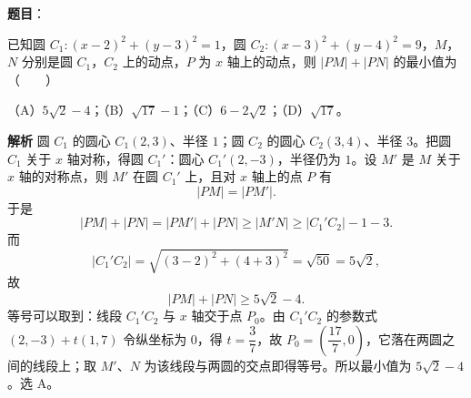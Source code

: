 \begin{answer}

\textbf{题目}：

已知圆 $C_1:(x-2)^2+(y-3)^2=1$，圆 $C_2:(x-3)^2+(y-4)^2=9$，$M$，$N$ 分别是圆 $C_1$，$C_2$ 上的动点，$P$ 为 $x$ 轴上的动点，则 $|PM|+|PN|$ 的最小值为\mbox{（　　）}

（A）$5\sqrt2-4$；（B）$\sqrt{17}-1$；（C）$6-2\sqrt2$；（D）$\sqrt{17}$。

\textbf{解析}
圆 $C_1$ 的圆心 $C_1(2,3)$、半径 $1$；圆 $C_2$ 的圆心 $C_2(3,4)$、半径 $3$。把圆 $C_1$ 关于 $x$ 轴对称，得圆 $C_1'$：圆心 $C_1'(2,-3)$，半径仍为 $1$。设 $M'$ 是 $M$ 关于 $x$ 轴的对称点，则 $M'$ 在圆 $C_1'$ 上，且对 $x$ 轴上的点 $P$ 有
\nopagebreak[4]
\[|PM|=|PM'|.\]
于是
\nopagebreak[4]
\[|PM|+|PN|=|PM'|+|PN|\geqslant|M'N|\geqslant|C_1'C_2|-1-3.\]
而
\nopagebreak[4]
\[|C_1'C_2|=\sqrt{(3-2)^2+(4+3)^2}=\sqrt{50}=5\sqrt2,\]
故
\nopagebreak[4]
\[|PM|+|PN|\geqslant5\sqrt2-4.\]
等号可以取到：线段 $C_1'C_2$ 与 $x$ 轴交于点 $P_0$。由 $C_1'C_2$ 的参数式 $(2,-3)+t(1,7)$ 令纵坐标为 $0$，得 $t=\dfrac37$，故 $P_0=\left(\dfrac{17}7,0\right)$，它落在两圆之间的线段上；取 $M'$、$N$ 为该线段与两圆的交点即得等号。所以最小值为 $5\sqrt2-4$。选 A。


\end{answer}
